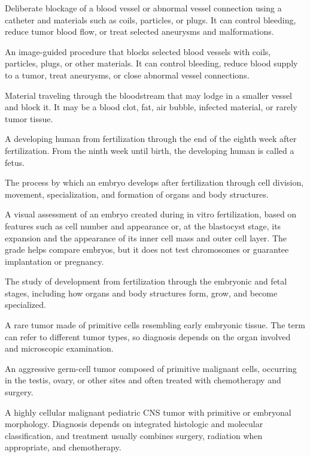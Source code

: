 Deliberate blockage of a blood vessel or abnormal vessel connection using a catheter and materials such as coils, particles, or plugs. It can control bleeding, reduce tumor blood flow, or treat selected aneurysms and malformations.

 An image-guided procedure that blocks selected blood vessels with coils, particles, plugs, or other materials. It can control bleeding, reduce blood supply to a tumor, treat aneurysms, or close abnormal vessel connections.

 Material traveling through the bloodstream that may lodge in a smaller vessel and block it. It may be a blood clot, fat, air bubble, infected material, or rarely tumor tissue.

 A developing human from fertilization through the end of the eighth week after fertilization. From the ninth week until birth, the developing human is called a fetus.

 The process by which an embryo develops after fertilization through cell division, movement, specialization, and formation of organs and body structures.

 A visual assessment of an embryo created during in vitro fertilization, based on features such as cell number and appearance or, at the blastocyst stage, its expansion and the appearance of its inner cell mass and outer cell layer. The grade helps compare embryos, but it does not test chromosomes or guarantee implantation or pregnancy.

 The study of development from fertilization through the embryonic and fetal stages, including how organs and body structures form, grow, and become specialized.

 A rare tumor made of primitive cells resembling early embryonic tissue. The term can refer to different tumor types, so diagnosis depends on the organ involved and microscopic examination.

 An aggressive germ-cell tumor composed of primitive malignant cells, occurring in the testis, ovary, or other sites and often treated with chemotherapy and surgery.

 A highly cellular malignant pediatric CNS tumor with primitive or embryonal morphology. Diagnosis depends on integrated histologic and molecular classification, and treatment usually combines surgery, radiation when appropriate, and chemotherapy.

